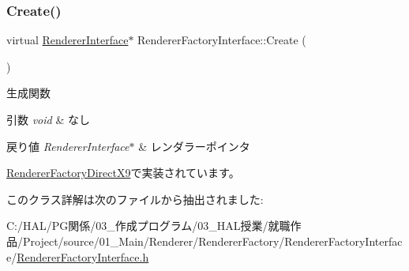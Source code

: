 \subsubsection{\texorpdfstring{Create()}{Create()}}
{\footnotesize\ttfamily virtual \mbox{\hyperlink{class_renderer_interface}{Renderer\+Interface}}$\ast$ Renderer\+Factory\+Interface\+::\+Create (\begin{DoxyParamCaption}{ }\end{DoxyParamCaption})\hspace{0.3cm}{\ttfamily [pure virtual]}}



生成関数 


\begin{DoxyParams}{引数}
{\em void} & なし \\
\hline
\end{DoxyParams}

\begin{DoxyRetVals}{戻り値}
{\em Renderer\+Interface$\ast$} & レンダラーポインタ \\
\hline
\end{DoxyRetVals}


\mbox{\hyperlink{class_renderer_factory_direct_x9_a55541ea707af7ba3c006b0ea11a1fd49}{Renderer\+Factory\+Direct\+X9}}で実装されています。



このクラス詳解は次のファイルから抽出されました\+:\begin{DoxyCompactItemize}
\item 
C\+:/\+H\+A\+L/\+P\+G関係/03\+\_\+作成プログラム/03\+\_\+\+H\+A\+L授業/就職作品/\+Project/source/01\+\_\+\+Main/\+Renderer/\+Renderer\+Factory/\+Renderer\+Factory\+Interface/\mbox{\hyperlink{_renderer_factory_interface_8h}{Renderer\+Factory\+Interface.\+h}}\end{DoxyCompactItemize}
